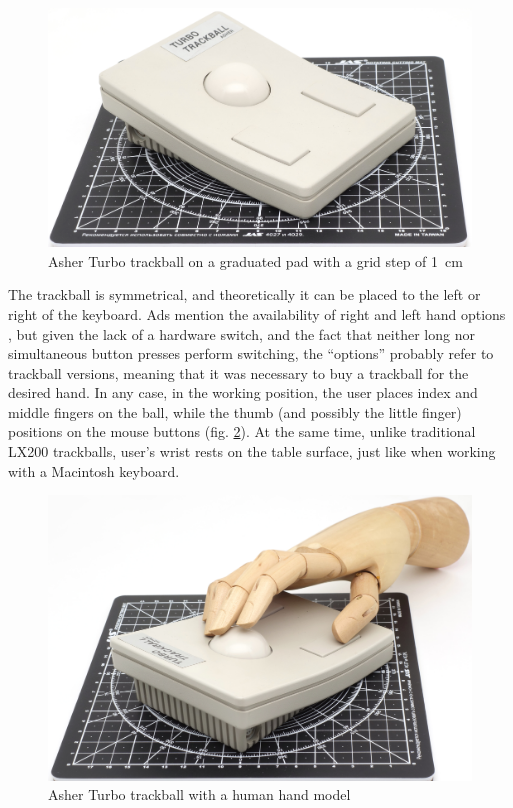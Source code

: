 \documentclass[11pt, a4paper]{article}
\begin{document}
\begin{figure}[h]
    \centering
    \includegraphics[scale=0.6]{1988_asher_turbo_trackball/size_30.jpg}
    \caption{Asher Turbo trackball on a graduated pad with a grid step of 1~cm}
    \label{fig:AsherSize}
\end{figure}

The trackball is symmetrical, and theoretically it can be placed to the left or right of the keyboard. Ads mention the availability of right and left hand options \cite{turbo}, but given the lack of a hardware switch, and the fact that neither long nor simultaneous button presses perform switching, the ``options'' probably refer to trackball versions, meaning that it was necessary to buy a trackball for the desired hand. In any case, in the working position, the user places index and middle fingers on the ball, while the thumb (and possibly the little finger) positions on the mouse buttons (fig. \ref{fig:AsherHand}). At the same time, unlike traditional LX200 trackballs, user's wrist rests on the table surface, just like when working with a Macintosh keyboard.

\begin{figure}[h]
    \centering
    \includegraphics[scale=0.5]{1988_asher_turbo_trackball/hand_30.jpg}
    \caption{Asher Turbo trackball with a human hand model}
    \label{fig:AsherHand}
\end{figure}
\end{document}

